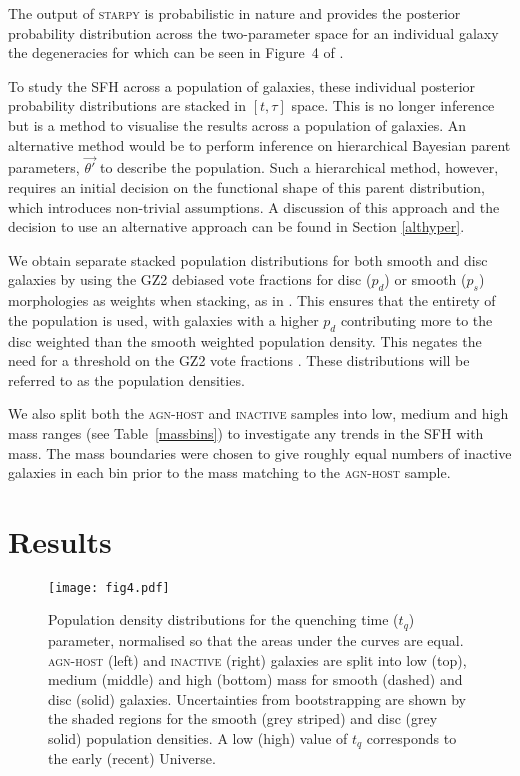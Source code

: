 \documentclass[useAMS,usenatbib]{mn2e}
\def\changed    {\color{nc} }
\def\changedbds    {\color{ncc} }
\def\secondchange    {\color{srv} }
\def\newref    {\color{new} }
\def\starpy ~{\textsc{starpy}}
\begin{document}
The output of \starpy  ~ is probabilistic in nature and provides the posterior probability distribution across the two-parameter space for an individual galaxy {\newref the degeneracies for which can be seen in Figure~4 of \citet{Sme2015}}. {\changed To study the SFH across a population of galaxies, these individual posterior probability distributions are {\secondchange stacked in $[t, \tau]$ space. This is no longer inference but is a method to visualise the results across a population of galaxies. An alternative method would be to perform inference on hierarchical Bayesian parent parameters, $\vec{\theta'}$ to describe the population. Such a hierarchical method, however, requires an initial decision on the functional shape of this parent distribution, which introduces non-trivial assumptions. A discussion of this approach and the decision to use an alternative approach can be found in Section \ref{althyper}.}

We obtain separate stacked population distributions for both smooth and disc galaxies by using the GZ2 debiased vote fractions for disc ($p_d$) or smooth ($p_s$) morphologies as weights when stacking, as in \citet{Sme2015}. This ensures that the entirety of the population is used, with galaxies with a higher $p_d$ contributing more to the disc weighted than the smooth weighted population density. This negates the need for a threshold on the GZ2 vote fractions \citep[e.g., $p_d > 0.8$ as used in][]{Sch2014}. {\secondchange These distributions will be referred to as the population densities.}}


We also split both the \textsc{agn-host} and \textsc{inactive} samples into low, medium and high mass ranges (see Table~\ref{massbins}) to investigate any trends in the SFH with mass. {\changed The mass boundaries were chosen to give roughly equal numbers of inactive galaxies in each bin prior to the mass matching to the \textsc{agn-host} sample.} 


\section{Results}

\begin{figure*}
\texttt{[image: fig4.pdf]}
\caption{{\secondchange Population density} distributions for the quenching time ($t_q$) parameter, {\changedbds normalised so that the areas under the curves are equal}. \textsc{agn-host} (left) and \textsc{inactive} (right) galaxies are split into low (top), medium (middle) and high (bottom) mass for smooth (dashed) and disc (solid) galaxies. {\newref Uncertainties from bootstrapping are shown by the shaded regions for the smooth (grey striped) and disc (grey solid) population densities.} A low (high) value of $t_q$ corresponds to the early (recent) Universe.}
\label{time}
\end{figure*}
\end{document}
